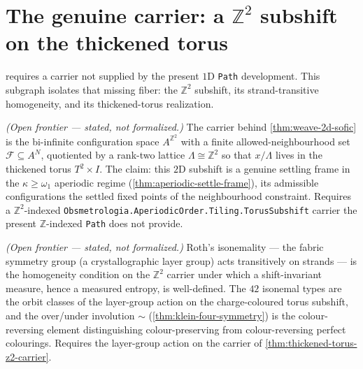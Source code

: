 \section{The genuine carrier: a $\mathbb{Z}^2$ subshift on the thickened torus}

 requires a carrier not supplied by the present
$1$D \texttt{Path} development.  This subgraph isolates that missing fiber: the
$\mathbb{Z}^2$ subshift, its strand-transitive homogeneity, and its
thickened-torus realization.

\begin{theorem}\label{thm:thickened-torus-z2-carrier}\notready{}
\emph{(Open frontier --- stated, not formalized.)} The carrier behind \cref{thm:weave-2d-sofic}
is the bi-infinite configuration space $A^{\mathbb{Z}^2}$ with a finite allowed-neighbourhood
set $\mathcal{F}\subseteq A^N$, quotiented by a rank-two lattice $\Lambda\cong\mathbb{Z}^2$ so
that $x/\Lambda$ lives in the thickened torus $T^2\times I$. The claim: this $2$D subshift is
a genuine settling frame in the $\kappa\geq\omega_1$ aperiodic regime
(\cref{thm:aperiodic-settle-frame}), its admissible configurations the settled fixed points of
the neighbourhood constraint. Requires a $\mathbb{Z}^2$-indexed
\texttt{Obsmetrologia.AperiodicOrder.Tiling.TorusSubshift} carrier the present $\mathbb{Z}$-indexed
\texttt{Path} does not provide.
\end{theorem}

\begin{theorem}\label{thm:isonemal-layergroup-transitivity}\notready{}
\emph{(Open frontier --- stated, not formalized.)} Roth's isonemality --- the fabric
symmetry group (a crystallographic layer group) acts transitively on strands --- is the
homogeneity condition on the $\mathbb{Z}^2$ carrier under which a shift-invariant measure,
hence a measured entropy, is well-defined. The $42$ isonemal types are the orbit classes of
the layer-group action on the charge-coloured torus subshift, and the over/under involution
$\sim$ (\cref{thm:klein-four-symmetry}) is the colour-reversing element distinguishing
colour-preserving from colour-reversing perfect colourings. Requires the layer-group action
on the carrier of \cref{thm:thickened-torus-z2-carrier}.
\end{theorem}

